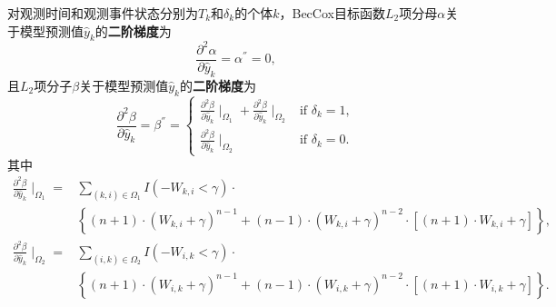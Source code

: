 \begin{theorem}\label{thm:2.4}
对观测时间和观测事件状态分别为$T_k$和$\delta_k$的个体$k$，BecCox目标函数$L_2$项分母$\alpha$关于模型预测值$\hat{y}_k$的\textbf{二阶梯度}为$$
\frac{\partial^2 \alpha}{\partial \hat{y}_k}=\alpha^{''}=0,
$$ 且$L_2$项分子$\beta$关于模型预测值$\hat{y}_k$的\textbf{二阶梯度}为$$
\frac{\partial^2 \beta}{\partial \hat{y}_k}=\beta^{''}=
\begin{cases}
\frac{\partial^2 \beta}{\partial \hat{y}_k} \mid_{\Omega_1} + \frac{\partial^2 \beta}{\partial \hat{y}_k} \mid_{\Omega_2} & \text{if } \delta_k = 1,\\
\frac{\partial^2 \beta}{\partial \hat{y}_k} \mid_{\Omega_2} & \text{if } \delta_k = 0.
\end{cases}
$$ 其中\[
\begin{split}
\frac{\partial^2 \beta}{\partial \hat{y}_k} \mid_{\Omega_1} =& \sum\limits_{(k,i)\in \Omega_1} I(-W_{k,i}<\gamma)\cdot \\
  & \left\{(n+1)\cdot (W_{k,i}+\gamma)^{n-1} + (n-1)\cdot (W_{k,i}+\gamma)^{n-2}\cdot [(n+1)\cdot W_{k,i}+\gamma]\right\}, \\
\frac{\partial^2 \beta}{\partial \hat{y}_k} \mid_{\Omega_2} =& \sum\limits_{(i,k)\in \Omega_2} I(-W_{i,k}<\gamma)\cdot \\
  & \left\{(n+1)\cdot (W_{i,k}+\gamma)^{n-1} + (n-1)\cdot (W_{i,k}+\gamma)^{n-2}\cdot [(n+1)\cdot W_{i,k}+\gamma]\right\}.
\end{split}
\]
\end{theorem}

